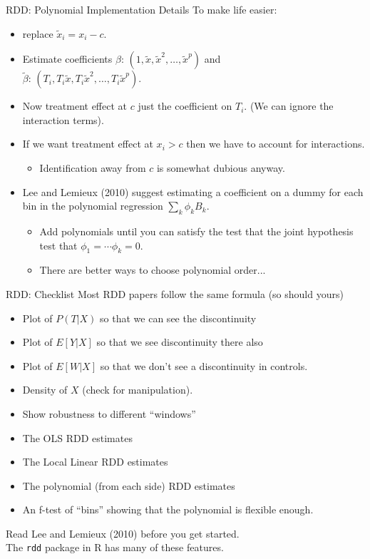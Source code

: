\documentclass[xcolor=pdftex,dvipsnames,table,mathserif,aspectratio=169]{beamer}
\begin{document}
\begin{frame}{RDD: Polynomial Implementation Details}
To make life easier:
\begin{itemize}
\item replace $\tilde{x}_i = x_i - c$.
\item Estimate coefficients $\beta$: $(1, \tilde{x}, \tilde{x}^2, \ldots, \tilde{x}^p)$ and\\
 $\tilde{\beta}$: $(T_i, T_i \tilde{x},T_i \tilde{x}^2, \ldots, T_i \tilde{x}^p)$.
 \item Now treatment effect at $c$ just the coefficient on $T_i$. (We can ignore the interaction terms).
 \item If we want treatment effect at $x_i > c$ then we have to account for interactions.
 \begin{itemize}
 \item Identification away from $c$ is somewhat dubious anyway.
\end{itemize}
\item Lee and Lemieux (2010) suggest estimating a coefficient on a dummy for each bin in the polynomial regression $\sum_{k} \phi_k B_k$.
 \begin{itemize}
 \item Add polynomials until you can satisfy the test that the joint hypothesis test that $\phi_1 = \cdots \phi_k= 0$.
\item There are better ways to choose polynomial order...
\end{itemize}
\end{itemize}
\end{frame}

	
\begin{frame}{RDD: Checklist}
Most RDD papers follow the same formula (so should yours)
\begin{itemize}
\item Plot of $P(T | X)$ so that we can see the discontinuity
\item Plot of $E[Y | X]$ so that we see discontinuity there also
\item Plot of $E[W | X ]$ so that we don't see a discontinuity in controls.
\item Density of $X$ (check for manipulation).
\item Show robustness to different ``windows''
\item The OLS RDD estimates
\item The Local Linear RDD estimates
\item The polynomial (from each side) RDD estimates
\item An f-test of ``bins'' showing that the polynomial is flexible enough.
\end{itemize}
Read Lee and Lemieux (2010) before you get started.\\
The \texttt{rdd} package in R has many of these features.
\end{frame}
\end{document}
